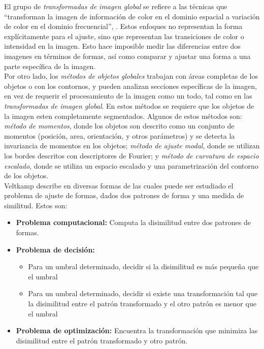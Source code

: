 El grupo de \emph{transformadas de imagen global} se refiere a las 
t\'ecnicas que ``transforman la imagen de informaci\'on de color en
el dominio espacial a variaci\'on de color en el dominio frecuencial'', 
\cite{matchingbook}. Estos enfoques no representan la forma expl\'icitamente 
para el ajuste,
sino que representan las transiciones de color o intensidad en
la imagen. Esto hace imposible medir las diferencias entre dos
imagenes en t\'erminos de formas, as\'i como comparar y ajustar
una forma a una parte espec\'ifica de la imagen.\\
Por otro lado, los \emph{m\'etodos de objetos globales} trabajan 
con \'areas completas de los objetos o con los contornos, y pueden
analizan secciones espec\'ificas de la imagen, en vez de requerir
el procesamiento de la imagen como un todo, tal como en las 
\emph{transformadas de imagen global}. En estos m\'etodos se requiere
que los objetos de la imagen esten completamente segmentados. Algunos
de estos m\'etodos son: \emph{m\'etodo de momentos}, donde los
objetos son descrito como un conjunto de momentos (posici\'on, area,
orientaci\'on, y otros par\'ametros) y se detecta la invariancia de 
momentos en los objetos; \emph{m\'etodo de ajuste modal}, donde 
se utilizan los bordes descritos con descriptores de Fourier; y
\emph{m\'etodo de curvatura de espacio escalado}, donde se utiliza 
un espacio escalado y una parametrizaci\'on del contorno de los objetos.\\

Veltkamp describe en \cite{matching2} diversas formas de las cuales
puede ser estudiado el problema de ajuste de formas, dados
dos patrones de forma y una medida de similitud. Estos son:


\begin{itemize}
\item \textbf{Problema computacional:} Computa la disimilitud entre
dos patrones de formas.
\item \textbf{Problema de decisi\'on: }
  \begin{itemize}
  \item  Para un umbral determinado, decidir si la disimilitud es 
    m\'as peque\~na que el umbral
  \item Para un umbral determinado, decidir si existe una transformaci\'on
    tal que la disimilitud entre el patr\'on transformado y el otro
    patr\'on es menor que el umbral
  \end{itemize}
 
\item \textbf{Problema de optimizaci\'on: } Encuentra la transformaci\'on
que minimiza las disimilitud entre el patr\'on transformado y otro patr\'on.
\end{itemize}


